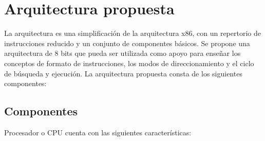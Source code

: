 \documentclass[12pt,twoside]{templates/unerthesis}
\begin{document}
\hypertarget{arquitectura-propuesta}{%
\section{Arquitectura propuesta}\label{arquitectura-propuesta}}

La arquitectura es una simplificación de la arquitectura x86, con un repertorio de instrucciones reducido y un conjunto de componentes básicos. Se propone una arquitectura de 8 bits que pueda ser utilizada como apoyo para enseñar los conceptos de formato de instrucciones, los modos de direccionamiento y el ciclo de búsqueda y ejecución. La arquitectura propuesta consta de los siguientes componentes:

\hypertarget{componentes}{%
\subsection{Componentes}\label{componentes}}

Procesador o CPU cuenta con las siguientes características:
\end{document}
